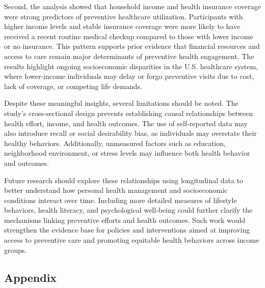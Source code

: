 \documentclass[
  letterpaper,
  DIV=11,
  numbers=noendperiod]{scrartcl}
\newenvironment{Shaded}{\begin{snugshade}}{\end{snugshade}}
\newcommand{\AttributeTok}[1]{\textcolor[rgb]{0.40,0.45,0.13}{#1}}
\newcommand{\ConstantTok}[1]{\textcolor[rgb]{0.56,0.35,0.01}{#1}}
\newcommand{\FunctionTok}[1]{\textcolor[rgb]{0.28,0.35,0.67}{#1}}
\newcommand{\NormalTok}[1]{\textcolor[rgb]{0.00,0.23,0.31}{#1}}
\newcommand{\SpecialCharTok}[1]{\textcolor[rgb]{0.37,0.37,0.37}{#1}}
\newcommand{\StringTok}[1]{\textcolor[rgb]{0.13,0.47,0.30}{#1}}
\begin{document}
Second, the analysis showed that household income and health insurance
coverage were strong predictors of preventive healthcare utilization.
Participants with higher income levels and stable insurance coverage
were more likely to have received a recent routine medical checkup
compared to those with lower income or no insurance. This pattern
supports prior evidence that financial resources and access to care
remain major determinants of preventive health engagement. The results
highlight ongoing socioeconomic disparities in the U.S. healthcare
system, where lower-income individuals may delay or forgo preventive
visits due to cost, lack of coverage, or competing life demands.

Despite these meaningful insights, several limitations should be noted.
The study's cross-sectional design prevents establishing causal
relationships between health effort, income, and health outcomes. The
use of self-reported data may also introduce recall or social
desirability bias, as individuals may overstate their healthy behaviors.
Additionally, unmeasured factors such as education, neighborhood
environment, or stress levels may influence both health behavior and
outcomes.

Future research should explore these relationships using longitudinal
data to better understand how personal health management and
socioeconomic conditions interact over time. Including more detailed
measures of lifestyle behaviors, health literacy, and psychological
well-being could further clarify the mechanisms linking preventive
efforts and health outcomes. Such work would strengthen the evidence
base for policies and interventions aimed at improving access to
preventive care and promoting equitable health behaviors across income
groups.

\subsection{Appendix}\label{appendix}

\begin{Shaded}
\end{Shaded}
\end{document}

